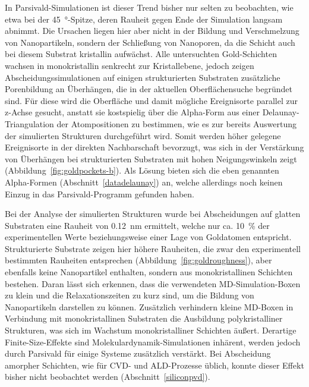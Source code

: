 In Parsivald-Simulationen ist dieser Trend bisher nur selten zu beobachten, wie etwa bei der \SI{45}{\degree}-Spitze, deren Rauheit gegen Ende der Simulation langsam abnimmt.
Die Ursachen liegen hier aber nicht in der Bildung und Verschmelzung von Nanopartikeln, sondern der Schließung von Nanoporen, da die Schicht auch bei diesem Substrat kristallin aufwächst.
Alle untersuchten Gold-Schichten wachsen in monokristallin senkrecht zur Kristallebene, jedoch zeigen Abscheidungssimulationen auf einigen strukturierten Substraten zusätzliche Porenbildung an Überhängen, die in der aktuellen Oberflächensuche begründet sind.
Für diese wird die Oberfläche und damit mögliche Ereignisorte parallel zur z-Achse gesucht, anstatt sie kostspielig über die Alpha-Form aus einer Delaunay-Triangulation der Atompositionen zu bestimmen, wie es zur bereits Auswertung der simulierten Strukturen durchgeführt wird.
Somit werden höher gelegene Ereignisorte in der direkten Nachbarschaft bevorzugt, was sich in der Verstärkung von Überhängen bei strukturierten Substraten mit hohen Neigungswinkeln zeigt (Abbildung~\ref{fig:goldpockets-b}).
Als Lösung bieten sich die eben genannten Alpha-Formen (Abschnitt~\ref{datadelaunay}) an, welche allerdings noch keinen Einzug in das Parsivald-Programm gefunden haben.

Bei der Analyse der simulierten Strukturen wurde bei Abscheidungen auf glatten Substraten eine Rauheit von \SI{0.12}{\nano\meter} ermittelt, welche nur ca. \SI{10}{\percent} der experimentellen Werte beziehungsweise einer Lage von Goldatomen entspricht.
Strukturierte Substrate zeigen hier höhere Rauheiten, die zwar den experimentell bestimmten Rauheiten entsprechen (Abbildung~\ref{fig:goldroughness}), aber ebenfalls keine Nanopartikel enthalten, sondern aus monokristallinen Schichten bestehen.
Daran lässt sich erkennen, dass die verwendeten MD-Simulation-Boxen zu klein und die Relaxationszeiten zu kurz sind, um die Bildung von Nanopartikeln darstellen zu können.
Zusätzlich verhindern kleine MD-Boxen in Verbindung mit monokristallinen Substraten die Ausbildung polykristalliner Strukturen, was sich im Wachstum monokristalliner Schichten äußert.
Derartige Finite-Size-Effekte sind Molekulardynamik-Simulationen inhärent, werden jedoch durch Parsivald für einige Systeme zusätzlich verstärkt.
Bei Abscheidung amorpher Schichten, wie für CVD- und ALD-Prozesse üblich, konnte dieser Effekt bisher nicht beobachtet werden (Abschnitt~\ref{siliconpvd}).

